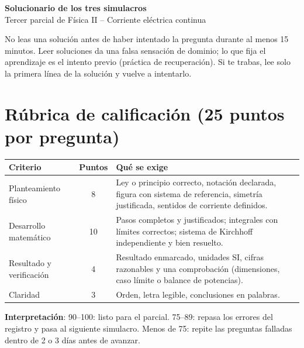 \documentclass[11pt]{article}
\begin{document}
\begin{center}
{\LARGE\bfseries Solucionario de los tres simulacros}\\[4pt]
{\large Tercer parcial de Física II -- Corriente eléctrica continua}
\end{center}

\begin{alerta}
No leas una solución antes de haber intentado la pregunta durante al menos 15 minutos. Leer soluciones da una falsa sensación de dominio; lo que fija el aprendizaje es el intento previo (práctica de recuperación). Si te trabas, lee solo la primera línea de la solución y vuelve a intentarlo.
\end{alerta}

\section*{Rúbrica de calificación (25 puntos por pregunta)}
\begin{center}
\begin{tabularx}{\linewidth}{@{}lcX@{}}
\toprule
\textbf{Criterio} & \textbf{Puntos} & \textbf{Qué se exige}\\
\midrule
Planteamiento físico & 8 & Ley o principio correcto, notación declarada, figura con sistema de referencia, simetría justificada, sentidos de corriente definidos.\\
Desarrollo matemático & 10 & Pasos completos y justificados; integrales con límites correctos; sistema de Kirchhoff independiente y bien resuelto.\\
Resultado y verificación & 4 & Resultado enmarcado, unidades SI, cifras razonables y una comprobación (dimensiones, caso límite o balance de potencias).\\
Claridad & 3 & Orden, letra legible, conclusiones en palabras.\\
\bottomrule
\end{tabularx}
\end{center}
\textbf{Interpretación}: 90--100: listo para el parcial. 75--89: repasa los errores del registro y pasa al siguiente simulacro. Menos de 75: repite las preguntas falladas dentro de 2 o 3 días antes de avanzar.

\tableofcontents




\end{document}
